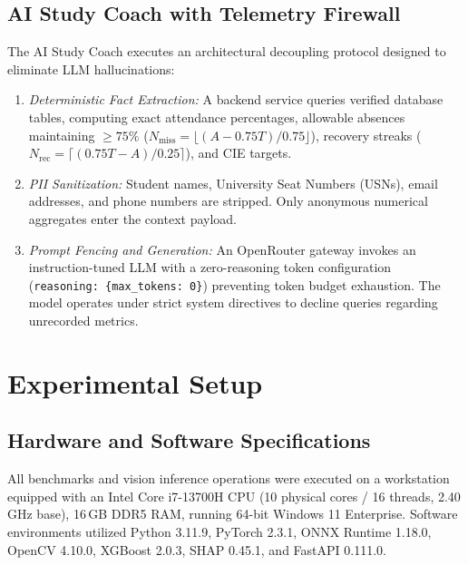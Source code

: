 \documentclass[conference]{IEEEtran}
\begin{document}
\subsection{AI Study Coach with Telemetry Firewall}
The AI Study Coach executes an architectural decoupling protocol designed to eliminate LLM hallucinations:
\begin{enumerate}
    \item \textit{Deterministic Fact Extraction:} A backend service queries verified database tables, computing exact attendance percentages, allowable absences maintaining $\ge 75\%$ ($N_{\text{miss}} = \lfloor (A - 0.75T)/0.75 \rfloor$), recovery streaks ($N_{\text{rec}} = \lceil (0.75T - A)/0.25 \rceil$), and CIE targets.
    \item \textit{PII Sanitization:} Student names, University Seat Numbers (USNs), email addresses, and phone numbers are stripped. Only anonymous numerical aggregates enter the context payload.
    \item \textit{Prompt Fencing and Generation:} An OpenRouter gateway invokes an instruction-tuned LLM with a zero-reasoning token configuration (\texttt{reasoning: \{max\_tokens: 0\}}) preventing token budget exhaustion. The model operates under strict system directives to decline queries regarding unrecorded metrics.
\end{enumerate}

\section{Experimental Setup}

\subsection{Hardware and Software Specifications}
All benchmarks and vision inference operations were executed on a workstation equipped with an Intel Core i7-13700H CPU (10 physical cores / 16 threads, 2.40\,GHz base), 16\,GB DDR5 RAM, running 64-bit Windows 11 Enterprise. Software environments utilized Python 3.11.9, PyTorch 2.3.1, ONNX Runtime 1.18.0, OpenCV 4.10.0, XGBoost 2.0.3, SHAP 0.45.1, and FastAPI 0.111.0.
\end{document}
